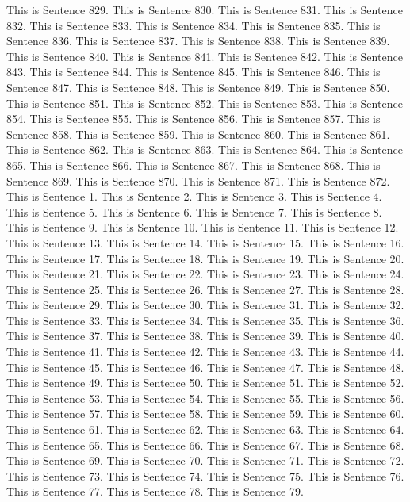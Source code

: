 \documentclass{article}
\begin{document}
This is Sentence 829.
This is Sentence 830.
This is Sentence 831.
This is Sentence 832.
This is Sentence 833.
This is Sentence 834.
This is Sentence 835.
This is Sentence 836.
This is Sentence 837.
This is Sentence 838.
This is Sentence 839.
This is Sentence 840.
This is Sentence 841.
This is Sentence 842.
This is Sentence 843.
This is Sentence 844.
This is Sentence 845.
This is Sentence 846.
This is Sentence 847.
This is Sentence 848.
This is Sentence 849.
This is Sentence 850.
This is Sentence 851.
This is Sentence 852.
This is Sentence 853.
This is Sentence 854.
This is Sentence 855.
This is Sentence 856.
This is Sentence 857.
This is Sentence 858.
This is Sentence 859.
This is Sentence 860.
This is Sentence 861.
This is Sentence 862.
This is Sentence 863.
This is Sentence 864.
This is Sentence 865.
This is Sentence 866.
This is Sentence 867.
This is Sentence 868.
This is Sentence 869.
This is Sentence 870.
This is Sentence 871.
This is Sentence 872.
This is Sentence 1.
This is Sentence 2.
This is Sentence 3.
This is Sentence 4.
This is Sentence 5.
This is Sentence 6.
This is Sentence 7.
This is Sentence 8.
This is Sentence 9.
This is Sentence 10.
This is Sentence 11.
This is Sentence 12.
This is Sentence 13.
This is Sentence 14.
This is Sentence 15.
This is Sentence 16.
This is Sentence 17.
This is Sentence 18.
This is Sentence 19.
This is Sentence 20.
This is Sentence 21.
This is Sentence 22.
This is Sentence 23.
This is Sentence 24.
This is Sentence 25.
This is Sentence 26.
This is Sentence 27.
This is Sentence 28.
This is Sentence 29.
This is Sentence 30.
This is Sentence 31.
This is Sentence 32.
This is Sentence 33.
This is Sentence 34.
This is Sentence 35.
This is Sentence 36.
This is Sentence 37.
This is Sentence 38.
This is Sentence 39.
This is Sentence 40.
This is Sentence 41.
This is Sentence 42.
This is Sentence 43.
This is Sentence 44.
This is Sentence 45.
This is Sentence 46.
This is Sentence 47.
This is Sentence 48.
This is Sentence 49.
This is Sentence 50.
This is Sentence 51.
This is Sentence 52.
This is Sentence 53.
This is Sentence 54.
This is Sentence 55.
This is Sentence 56.
This is Sentence 57.
This is Sentence 58.
This is Sentence 59.
This is Sentence 60.
This is Sentence 61.
This is Sentence 62.
This is Sentence 63.
This is Sentence 64.
This is Sentence 65.
This is Sentence 66.
This is Sentence 67.
This is Sentence 68.
This is Sentence 69.
This is Sentence 70.
This is Sentence 71.
This is Sentence 72.
This is Sentence 73.
This is Sentence 74.
This is Sentence 75.
This is Sentence 76.
This is Sentence 77.
This is Sentence 78.
This is Sentence 79.
\end{document}
